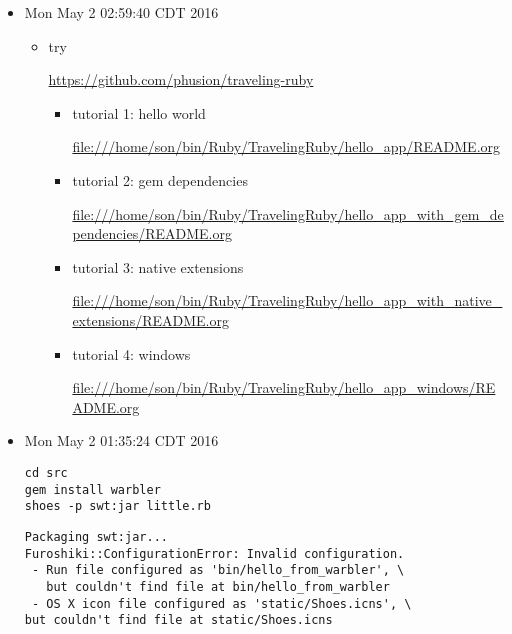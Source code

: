 \documentclass[11pt]{article}
\begin{document}
\begin{itemize}
\item Mon May  2 02:59:40 CDT 2016

\begin{itemize}
\item try

\url{https://github.com/phusion/traveling-ruby}

\begin{itemize}
\item tutorial 1: hello world

\url{file:///home/son/bin/Ruby/TravelingRuby/hello_app/README.org}

\item tutorial 2: gem dependencies

\url{file:///home/son/bin/Ruby/TravelingRuby/hello_app_with_gem_dependencies/README.org}

\item tutorial 3: native extensions

\url{file:///home/son/bin/Ruby/TravelingRuby/hello_app_with_native_extensions/README.org}

\item tutorial 4: windows

\url{file:///home/son/bin/Ruby/TravelingRuby/hello_app_windows/README.org}
\end{itemize}
\end{itemize}

\item Mon May  2 01:35:24 CDT 2016

\begin{verbatim}
cd src
gem install warbler
shoes -p swt:jar little.rb
\end{verbatim}

\begin{verbatim}
Packaging swt:jar...
Furoshiki::ConfigurationError: Invalid configuration.
 - Run file configured as 'bin/hello_from_warbler', \
   but couldn't find file at bin/hello_from_warbler
 - OS X icon file configured as 'static/Shoes.icns', \
but couldn't find file at static/Shoes.icns
\end{verbatim}


\end{itemize}
\end{document}
